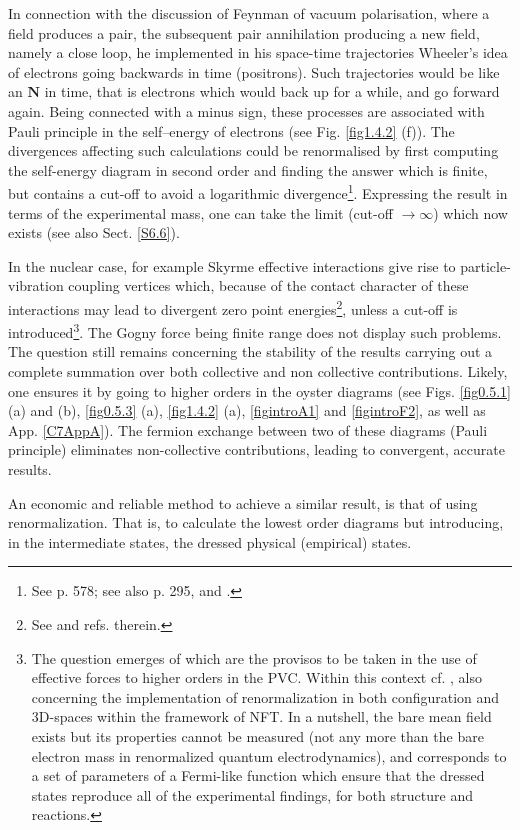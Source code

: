 \begin{subappendices}
 In connection with the discussion of Feynman of vacuum polarisation, where a field produces a pair,
 the subsequent pair annihilation producing a new field, namely a close loop, he implemented in his space-time trajectories 
 Wheeler's idea of electrons going backwards in time (positrons).  Such trajectories would be like an $\mathbf N$ in time,
 that is electrons which would back up for a while, and go forward again. Being connected 
 with a minus sign, these processes are associated with Pauli principle in the self--energy of electrons
 (see Fig. \ref{fig1.4.2} (f)). 
 The divergences affecting
 such calculations  could be renormalised by first computing the self-energy  diagram in second order and finding the answer which is finite, but contains a cut-off
 to avoid a logarithmic divergence\footnote{See \cite{Bethe:47,Feynman:61b,Weinberg:96} p. 578; see also \cite{Mehra:96} p. 295, and \cite{Bjorken:98}.}. Expressing the result in terms of the experimental mass, one can take 
 the limit (cut-off $\to \infty$) which now exists (see also Sect. \ref{S6.6}).
  
 In the nuclear case, for example Skyrme effective interactions give 
 rise to particle-vibration coupling vertices which, because of the contact character of these interactions 
 may lead to divergent zero point energies\footnote{See \cite{Hellemans:13,Pastore:15} and refs. therein.}, unless a cut-off is introduced\footnote{The question emerges of which are the provisos to be taken in the use of effective forces to higher orders in the PVC. Within this context cf. \cite{Mahaux:85}, also \cite{Broglia:16,Barranco:17} concerning the implementation of renormalization in both configuration and 3D-spaces within the framework of NFT. In a nutshell, the bare mean field exists but its properties cannot be measured (not any more than the bare electron mass in renormalized quantum electrodynamics), and corresponds to a set of parameters of a Fermi-like function which ensure that the dressed states reproduce all of the experimental findings, for both structure and reactions.}.
 The Gogny force being finite range does not display such problems. The question still remains concerning the stability of the results carrying out a complete summation over both collective and non collective contributions. 
 Likely, one ensures it   by going to higher orders in the oyster diagrams (see Figs. \ref{fig0.5.1} (a) and (b), \ref{fig0.5.3} (a),  \ref{fig1.4.2} (a), \ref{figintroA1} and \ref{figintroF2}, as well as App. \ref{C7AppA}). 
 The fermion exchange between two of these diagrams (Pauli principle)  eliminates  non-collective
 contributions, leading to convergent, accurate results.
 
 An economic and reliable method to achieve a similar result, 
 is that of using renormalization. That is, to calculate the lowest order diagrams 
 but introducing, in the intermediate states, the dressed physical (empirical) states.
 
 


\end{subappendices}


